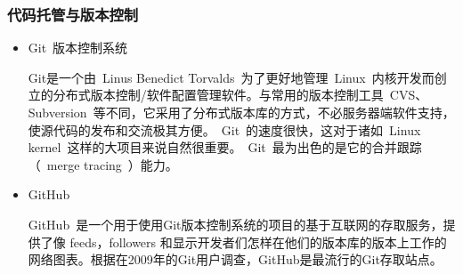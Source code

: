 \subsubsection{代码托管与版本控制}
\begin{itemize}
  \item Git~版本控制系统
  
  \CJKindent Git是一个由~Linus Benedict Torvalds~为了更好地管理~Linux~内核开发而创立的分布式版本控制/软件配置管理软件。与常用的版本控制工具~CVS、Subversion~等不同，它采用了分布式版本库的方式，不必服务器端软件支持，使源代码的发布和交流极其方便。~Git~的速度很快，这对于诸如~Linux kernel~这样的大项目来说自然很重要。~Git~最为出色的是它的合并跟踪（~merge tracing~）能力。
  
  \item GitHub
  
  \CJKindent GitHub~是一个用于使用Git版本控制系统的项目的基于互联网的存取服务，提供了像 feeds，followers 和显示开发者们怎样在他们的版本库的版本上工作的网络图表。根据在2009年的Git用户调查，GitHub是最流行的Git存取站点。
\end{itemize}
